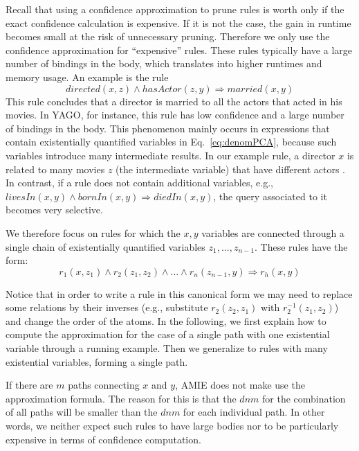 Recall that using a confidence approximation to prune rules is worth only if the exact confidence calculation is expensive. 
If it is not the case, the gain in runtime becomes small at the risk of unnecessary pruning.
Therefore we only use the confidence approximation for ``expensive'' rules. 
These rules typically have a large number of bindings in the body, which translates into 
higher runtimes and memory usage. An example is the rule 
\[
 directed(x,z) \wedge hasActor(z,y) \Rightarrow married(x,y)
\]
This rule concludes that a director is married to all the actors that acted in his movies. In YAGO, for instance,
this rule has low confidence and a large number of bindings in the body.
This phenomenon mainly occurs in expressions that contain existentially quantified variables in Eq.~\ref{eq:denomPCA}, 
because such variables introduce many intermediate results. In our example
rule, a director $x$ is related to many movies $z$ (the intermediate variable) that have different actors . 
In contrast, if a rule does not contain additional variables, 
e.g., $livesIn(x,y)\wedge bornIn(x,y)\Rightarrow diedIn(x,y)$, the query associated to it becomes very selective.

We therefore focus on rules for which the $x,y$ variables are connected through a single 
chain of existentially quantified variables $z_1,..., z_{n-1}$. These rules have the form:
$$
  r_1(x,z_1) \wedge r_2(z_1,z_2) \wedge ... \wedge r_n(z_{n-1},y) \Rightarrow r_h(x,y)
$$

Notice that in order to write a rule in this canonical form we may need to replace some relations by their inverses
(e.g., substitute $r_2(z_2,z_1)$ with $r_2^{-1}(z_1,z_2)$)
and change the order of the atoms.
In the following, we first explain how to compute the approximation for the case of a single 
path with one existential variable through a running example.
Then we generalize to rules with many existential variables, forming a single path. 

If there are $m$ paths connecting $x$ and $y$, AMIE does not make use the approximation formula. The reason for this is that the $dnm$
for the combination of all paths will be smaller than the $dnm$ for each individual path. 
In other words, we neither expect such rules to have large bodies nor to be particularly expensive in terms of confidence computation.


